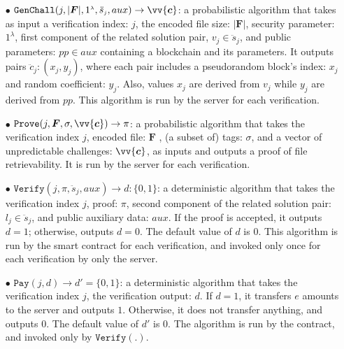 \begin{definition}
\begin{itemize}
\item[$\bullet$] $\mathtt{GenChall}(j,|{\bm{F}}|, 1^{\scriptscriptstyle\lambda},\ddot{s}_{\scriptscriptstyle j},aux)\rightarrow \vv{\bm{c}}$: a probabilistic algorithm that takes as input a verification index: $j$, the encoded file size: $|{\bm{F}}|$, security parameter: $1^{\scriptscriptstyle\lambda}$, first component of the related solution pair, $v_{\scriptscriptstyle j}\in \ddot{s}_{\scriptscriptstyle j}$, and public parameters: $pp\in aux$ containing  a blockchain and its parameters. It outputs pairs $\ddot{c}_{\scriptscriptstyle j} : (x_{\scriptscriptstyle j} , y_{\scriptscriptstyle j} )$, where each pair includes a pseudorandom  block's index:  $x_{\scriptscriptstyle j}$ and random coefficient: $y_{\scriptscriptstyle j}$. Also, values $x_{\scriptscriptstyle j}$ are derived from $v_{\scriptscriptstyle j}$ while $y_{\scriptscriptstyle j}$ are derived from $pp$. This algorithm is run by the server for each verification. 





\item[$\bullet$] $\mathtt{Prove}(j,{\bm{F}}, \sigma,  \vv{\bm{c}})\rightarrow \pi$: a probabilistic algorithm that takes the verification index $j$, encoded file: ${\bm{F}}$ , (a subset of) tags: $\sigma$, and a vector of unpredictable challenges: $\vv{\bm{c}}$, as inputs and outputs a proof of  file retrievability. It is run by the server for each verification.



\item[$\bullet$] $\mathtt{Verify}(j,\pi,\ddot{s}_{\scriptscriptstyle j},aux)\rightarrow d:\{0,1\}$: a deterministic algorithm that takes the verification index $j$, proof: $\pi$,  second component of the related solution pair: $l_{\scriptscriptstyle j}\in \ddot{s}_{\scriptscriptstyle j}$, and public auxiliary data: $aux$.  If the proof is accepted, it outputs $d=1$; otherwise, outputs $d=0$. The default value of $d$ is $0$. This algorithm is run by the smart contract for each verification, and invoked only once for each verification by only the server. 



\item[$\bullet$] $\mathtt{Pay}(j,d)\rightarrow d'=\{0,1\}$: a deterministic algorithm that takes the verification index $j$, the verification output: $d$. If $d=1$, it transfers $e$ amounts to the server and outputs $1$. Otherwise, it does not transfer anything, and outputs $0$. The default value of $d'$ is $0$. The algorithm is run by the  contract, and  invoked only by $\mathtt{Verify}(.)$. 
\end{itemize}
\end{definition}


